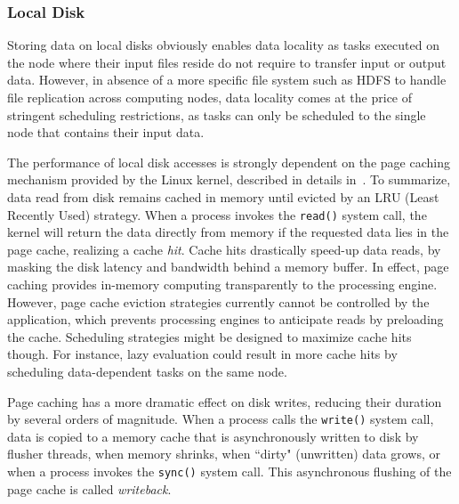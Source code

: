 \documentclass{IEEEtran}
\begin{document}
\subsubsection{Local Disk} %




Storing data on local disks obviously enables data locality as tasks 
executed on the node where their input files reside do not require to 
transfer input or output data. However, in absence of a more specific 
file system such as HDFS to handle 
file replication across computing nodes, data locality comes at the price
of stringent scheduling restrictions, as tasks can only be scheduled to the
single node that contains their input data.

The performance of local disk accesses is strongly dependent on the 
page caching mechanism provided by the Linux kernel, described in    
details in~\cite{love2010linux}. To summarize, data read from disk 
remains cached in memory until evicted by an LRU (Least Recently Used) 
strategy. When a process invokes the \texttt{read()} system call, the 
kernel will return the data directly from memory if the requested data 
lies in the page cache, realizing a cache \emph{hit}. Cache hits drastically speed-up data 
reads, by masking the disk latency and bandwidth behind a 
memory buffer. In effect, page caching provides in-memory computing 
transparently to the processing engine. However, page cache eviction 
strategies currently cannot be controlled by the application, which 
prevents processing engines to anticipate reads by preloading the 
cache. Scheduling strategies might be designed 
to maximize cache hits though. For instance, lazy 
evaluation could result in more cache hits by scheduling data-dependent 
tasks on the same node.

Page caching has a more dramatic effect on disk writes, reducing their 
duration by several orders of magnitude. When a process calls the 
\texttt{write()} system call, data is copied to a memory cache that is 
asynchronously written to disk by flusher threads, when memory shrinks, when
``dirty" (unwritten) data grows, or when a 
process invokes the \texttt{sync()} system call. 
This asynchronous flushing of the page cache is called 
\emph{writeback}.
\end{document}
